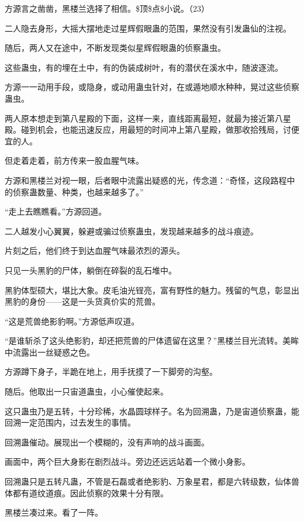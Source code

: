 
\begin{this_body}

方源言之凿凿，黑楼兰选择了相信。\$顶\$点\$小说。（23）

二人隐去身形，大摇大摆地走过星辉假眼蛊的范围，果然没有引发蛊仙的注视。

随后，两人又在途中，不断发现类似星辉假眼蛊的侦察蛊虫。

这些蛊虫，有的埋在土中，有的伪装成树叶，有的潜伏在溪水中，随波逐流。

方源一一动用手段，或隐身，或动用蛊虫针对，在或遁地顺水种种，晃过这些侦察蛊虫。

两人原本想走到第八星殿的下面，这样一来，直线距离最短，就最为接近第八星殿。碰到机会，也能迅速反应，用最短的时间冲上第八星殿，做那收拾残局，讨便宜的人。

但走着走着，前方传来一股血腥气味。

方源和黑楼兰对视一眼，后者眼中流露出疑惑的光，传念道：“奇怪，这段路程中的侦察蛊数量、种类，也越来越多了。”

“走上去瞧瞧看。”方源回道。

二人越发小心翼翼，躲避或骗过侦察蛊虫，发现越来越多的战斗痕迹。

片刻之后，他们终于到达血腥气味最浓烈的源头。

只见一头黑豹的尸体，躺倒在碎裂的乱石堆中。

黑豹体型硕大，堪比大象。皮毛油光锃亮，富有野性的魅力。残留的气息，彰显出黑豹的身份——这是一头货真价实的荒兽。

“这是荒兽绝影豹啊。”方源低声叹道。

“是谁斩杀了这头绝影豹，却还把荒兽的尸体遗留在这里？”黑楼兰目光流转。美眸中流露出一丝疑惑之色。

方源蹲下身子，半跪在地上，用手抚摸了一下脚旁的沟壑。

随后。他取出一只宙道蛊虫，小心催使起来。

这只蛊虫乃是五转，十分珍稀，水晶圆球样子。名为回溯蛊，乃是宙道侦察蛊，能回溯一定范围内，过去发生的事情。

回溯蛊催动。展现出一个模糊的，没有声响的战斗画面。

画面中，两个巨大身影在剧烈战斗。旁边还远远站着一个微小身影。

回溯蛊只是五转凡蛊，不管是石磊或者绝影豹、万象星君，都是六转级数，仙体兽体都有道纹道痕。因此侦察的效果十分有限。

黑楼兰凑过来。看了一阵。


\end{this_body}
